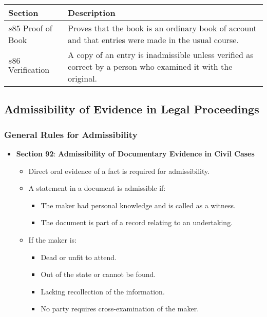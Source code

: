 \begin{longtable}[]{@{}
  >{\raggedright\arraybackslash}p{}
  >{\raggedright\arraybackslash}p{}@{}}
\toprule\noalign{}
\begin{minipage}[b]{\linewidth}\raggedright
Section
\end{minipage} & \begin{minipage}[b]{\linewidth}\raggedright
Description
\end{minipage} \\
\midrule\noalign{}
\endhead
\bottomrule\noalign{}
\endlastfoot
\(s85\) Proof of Book & Proves that the book is an ordinary book of
account and that entries were made in the usual course. \\
\(s86\) Verification & A copy of an entry is inadmissible unless
verified as correct by a person who examined it with the original. \\
\end{longtable}

\subsection{ Admissibility of Evidence in Legal
Proceedings}\label{admissibility-of-evidence-in-legal-proceedings}

\subsubsection{General Rules for
Admissibility}\label{general-rules-for-admissibility}

\begin{itemize}
\tightlist
\item
  \textbf{Section 92}: \textbf{Admissibility of Documentary Evidence in
  Civil Cases}

  \begin{itemize}
  \tightlist
  \item
    Direct oral evidence of a fact is required for admissibility.
  \item
    A statement in a document is admissible if:

    \begin{itemize}
    \tightlist
    \item
      The maker had personal knowledge and is called as a witness.
    \item
      The document is part of a record relating to an undertaking.
    \end{itemize}
  \item
    If the maker is:

    \begin{itemize}
    \tightlist
    \item
      Dead or unfit to attend.
    \item
      Out of the state or cannot be found.
    \item
      Lacking recollection of the information.
    \item
      No party requires cross-examination of the maker.
    \end{itemize}
  \end{itemize}
\end{itemize}


